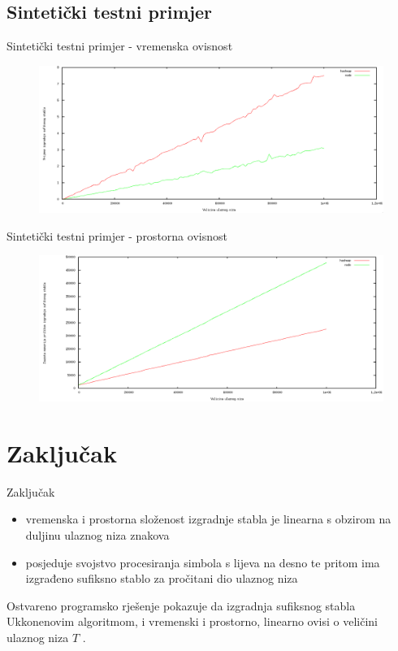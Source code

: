 \documentclass[utf8]{beamer}
\begin{document}
\subsection{Sintetički testni primjer}
\begin{frame}{Sintetički testni primjer - vremenska ovisnost}
\begin{figure}[h!]	
	\centering
	\includegraphics[width=1\textwidth]{media/time_r.png}
\end{figure}

\end{frame}
\begin{frame}{Sintetički testni primjer - prostorna ovisnost}

\begin{figure}[h!]	
	\centering
	\includegraphics[width=1\textwidth]{media/memory_r.png}
\end{figure}

\end{frame}

\section{Zaključak}
\begin{frame}{Zaključak}

\begin{itemize}
	\vspace{5mm}
	\item vremenska i prostorna složenost izgradnje stabla je linearna s obzirom na duljinu ulaznog niza znakova
	\vspace{5mm}
	\item posjeduje svojstvo procesiranja simbola s lijeva na desno te pritom ima izgrađeno sufiksno stablo za pročitani dio ulaznog niza
\end{itemize}


\pause
\vspace{5mm}
Ostvareno programsko rješenje pokazuje da izgradnja sufiksnog stabla Ukkonenovim algoritmom, i vremenski i prostorno, linearno ovisi o veličini ulaznog niza $T$ .


\end{frame}
\end{document}
